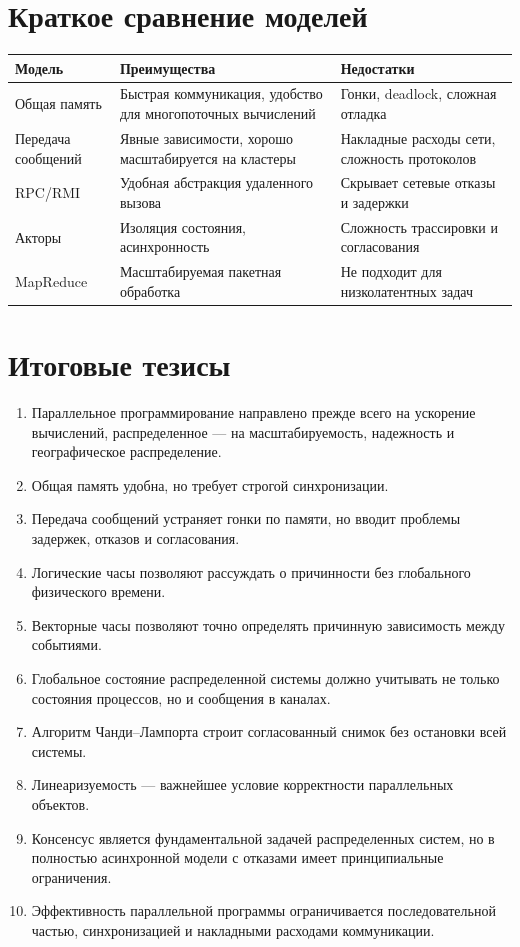 \documentclass[12pt,a4paper]{article}
\begin{document}
\section{Краткое сравнение моделей}

\begin{center}
\begin{tabular}{p{}p{}p{}}
\toprule
\textbf{Модель} & \textbf{Преимущества} & \textbf{Недостатки} \\
\midrule
Общая память & Быстрая коммуникация, удобство для многопоточных вычислений & Гонки, deadlock, сложная отладка \\
Передача сообщений & Явные зависимости, хорошо масштабируется на кластеры & Накладные расходы сети, сложность протоколов \\
RPC/RMI & Удобная абстракция удаленного вызова & Скрывает сетевые отказы и задержки \\
Акторы & Изоляция состояния, асинхронность & Сложность трассировки и согласования \\
MapReduce & Масштабируемая пакетная обработка & Не подходит для низколатентных задач \\
\bottomrule
\end{tabular}
\end{center}

\section{Итоговые тезисы}

\begin{enumerate}
    \item Параллельное программирование направлено прежде всего на ускорение вычислений, распределенное --- на масштабируемость, надежность и географическое распределение.
    \item Общая память удобна, но требует строгой синхронизации.
    \item Передача сообщений устраняет гонки по памяти, но вводит проблемы задержек, отказов и согласования.
    \item Логические часы позволяют рассуждать о причинности без глобального физического времени.
    \item Векторные часы позволяют точно определять причинную зависимость между событиями.
    \item Глобальное состояние распределенной системы должно учитывать не только состояния процессов, но и сообщения в каналах.
    \item Алгоритм Чанди--Лампорта строит согласованный снимок без остановки всей системы.
    \item Линеаризуемость --- важнейшее условие корректности параллельных объектов.
    \item Консенсус является фундаментальной задачей распределенных систем, но в полностью асинхронной модели с отказами имеет принципиальные ограничения.
    \item Эффективность параллельной программы ограничивается последовательной частью, синхронизацией и накладными расходами коммуникации.
\end{enumerate}
\end{document}
